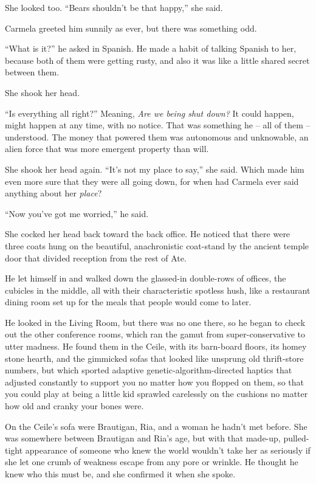 She looked too. “Bears shouldn't be that happy,” she said.

\tb

Carmela greeted him sunnily as ever, but there was something odd.

“What is it?” he asked in Spanish. He made a habit of talking 
Spanish to her, because both of them were getting rusty, and also it 
was like a little shared secret between them.

She shook her head.

“Is everything all right?” Meaning, \emph{Are we being shut down?} 
It could happen, might happen at any time, with no notice. That was 
something he -- all of them -- understood. The money that powered them 
was autonomous and unknowable, an alien force that was more emergent 
property than will.

She shook her head again. “It's not my place to say,” she said. 
Which made him even more sure that they were all going down, for when 
had Carmela ever said anything about her \emph{place}?

“Now you've got me worried,” he said.

She cocked her head back toward the back office. He noticed that there 
were three coats hung on the beautiful, anachronistic coat-stand by the 
ancient temple door that divided reception from the rest of Ate.

He let himself in and walked down the glassed-in double-rows of 
offices, the cubicles in the middle, all with their characteristic 
spotless hush, like a restaurant dining room set up for the meals that 
people would come to later.

He looked in the Living Room, but there was no one there, so he began 
to check out the other conference rooms, which ran the gamut from 
super-conservative to utter madness. He found them in the Ceile, with 
its barn-board floors, its homey stone hearth, and the gimmicked sofas 
that looked like unsprung old thrift-store numbers, but which sported 
adaptive genetic-algorithm-directed haptics that adjusted constantly to 
support you no matter how you flopped on them, so that you could play 
at being a little kid sprawled carelessly on the cushions no matter how 
old and cranky your bones were.

On the Ceile's sofa were Brautigan, Ria, and a woman he hadn't met 
before. She was somewhere between Brautigan and Ria's age, but with 
that made-up, pulled-tight appearance of someone who knew the world 
wouldn't take her as seriously if she let one crumb of weakness escape 
from any pore or wrinkle. He thought he knew who this must be, and she 
confirmed it when she spoke.

